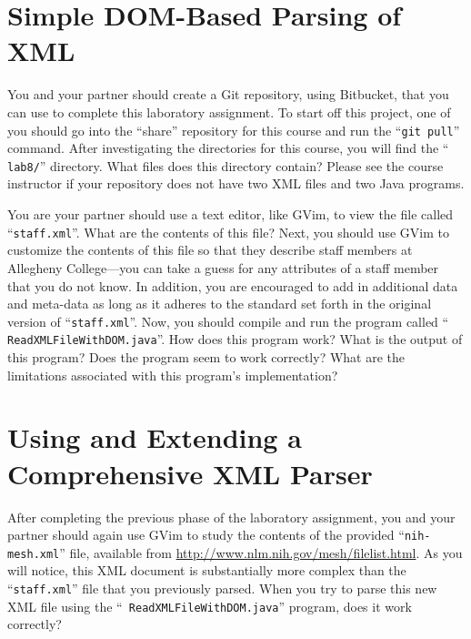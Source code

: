 \section*{Simple DOM-Based Parsing of XML}

You and your partner should create a Git repository, using Bitbucket, that you can use to complete this laboratory
assignment.  To start off this project, one of you should go into the ``share'' repository for this course and run the
``{\tt git pull}'' command. After investigating the directories for this course, you will find the ``{\tt
  lab8/}'' directory. What files does this directory contain?  Please see the course instructor if your repository does
not have two XML files and two Java programs.

You are your partner should use a text editor, like GVim, to view the file called ``{\tt staff.xml}''.  What are the
contents of this file?  Next, you should use GVim to customize the contents of this file so that they describe staff
members at Allegheny College---you can take a guess for any attributes of a staff member that you do not know.  In
addition, you are encouraged to add in additional data and meta-data as long as it adheres to the standard set forth in
the original version of ``{\tt staff.xml}''. Now, you should compile and run the program called ``{\tt
  ReadXMLFileWithDOM.java}''. How does this program work? What is the output of this program? Does the program seem to
work correctly? What are the limitations associated with this program's implementation? 

\vspace*{-.05in}
\section*{Using and Extending a Comprehensive XML Parser}

After completing the previous phase of the laboratory assignment, you and your partner should again use GVim to study
the contents of the provided ``{\tt nih-mesh.xml}'' file, available from
\url{http://www.nlm.nih.gov/mesh/filelist.html}. As you will notice, this XML document is substantially more complex
than the ``{\tt staff.xml}'' file that you previously parsed.  When you try to parse this new XML file using the ``{\tt
  ReadXMLFileWithDOM.java}'' program, does it work correctly?

